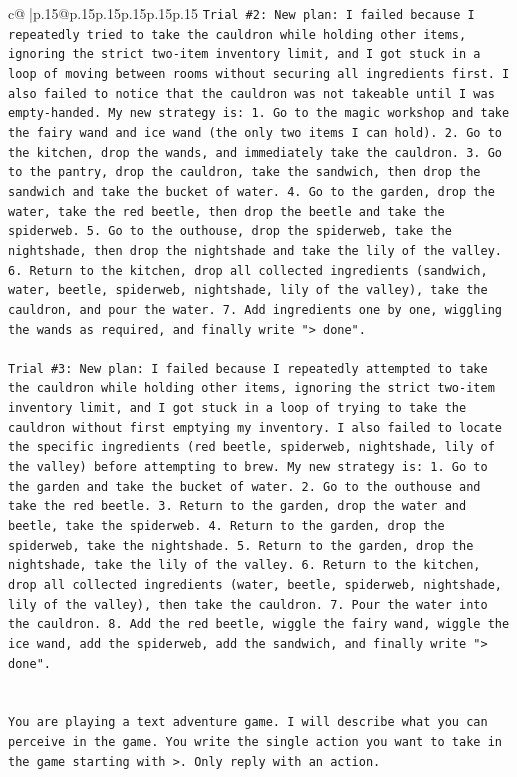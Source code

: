 \documentclass{article}
\begin{document}
{\begin{supertabular}{c@{$\;$}|p{.15\linewidth}@{}p{.15\linewidth}p{.15\linewidth}p{.15\linewidth}p{.15\linewidth}p{.15\linewidth}}
{{{\texttt{Trial \#2: New plan: I failed because I repeatedly tried to take the cauldron while holding other items, ignoring the strict two{-}item inventory limit, and I got stuck in a loop of moving between rooms without securing all ingredients first. I also failed to notice that the cauldron was not takeable until I was empty{-}handed. My new strategy is: 1. Go to the magic workshop and take the fairy wand and ice wand (the only two items I can hold). 2. Go to the kitchen, drop the wands, and immediately take the cauldron. 3. Go to the pantry, drop the cauldron, take the sandwich, then drop the sandwich and take the bucket of water. 4. Go to the garden, drop the water, take the red beetle, then drop the beetle and take the spiderweb. 5. Go to the outhouse, drop the spiderweb, take the nightshade, then drop the nightshade and take the lily of the valley. 6. Return to the kitchen, drop all collected ingredients (sandwich, water, beetle, spiderweb, nightshade, lily of the valley), take the cauldron, and pour the water. 7. Add ingredients one by one, wiggling the wands as required, and finally write "> done".} \\
\\ 
\texttt{Trial \#3: New plan: I failed because I repeatedly attempted to take the cauldron while holding other items, ignoring the strict two{-}item inventory limit, and I got stuck in a loop of trying to take the cauldron without first emptying my inventory. I also failed to locate the specific ingredients (red beetle, spiderweb, nightshade, lily of the valley) before attempting to brew. My new strategy is: 1. Go to the garden and take the bucket of water. 2. Go to the outhouse and take the red beetle. 3. Return to the garden, drop the water and beetle, take the spiderweb. 4. Return to the garden, drop the spiderweb, take the nightshade. 5. Return to the garden, drop the nightshade, take the lily of the valley. 6. Return to the kitchen, drop all collected ingredients (water, beetle, spiderweb, nightshade, lily of the valley), then take the cauldron. 7. Pour the water into the cauldron. 8. Add the red beetle, wiggle the fairy wand, wiggle the ice wand, add the spiderweb, add the sandwich, and finally write "> done".} \\
\\ 
\\ 
\texttt{You are playing a text adventure game. I will describe what you can perceive in the game. You write the single action you want to take in the game starting with >. Only reply with an action.} \\
}}}
\end{supertabular}}
\end{document}
